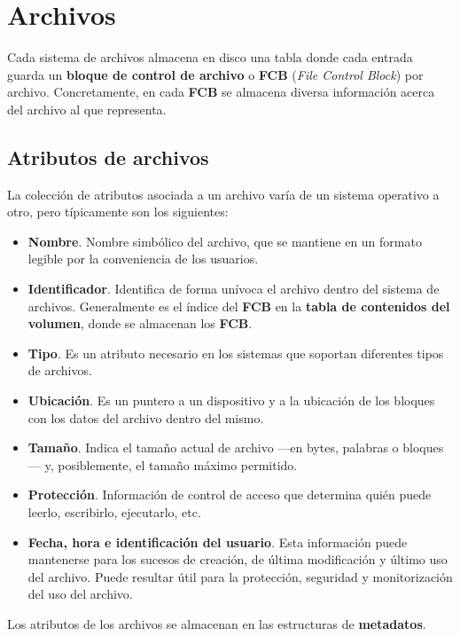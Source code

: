 \section{Archivos}\label{_archivos}

Cada sistema de archivos almacena en disco una tabla donde cada entrada
guarda un \textbf{bloque de control de archivo} o \textbf{FCB}
(\emph{File Control Block}) por archivo. Concretamente, en cada
\textbf{FCB} se almacena diversa información acerca del archivo al que
representa.

\subsection{Atributos de archivos}\label{_atributos_de_archivos}

La colección de atributos asociada a un archivo varía de un sistema
operativo a otro, pero típicamente son los siguientes:

\begin{itemize}
\item
  \textbf{Nombre}. Nombre simbólico del archivo, que se mantiene en un
  formato legible por la conveniencia de los usuarios.
\item
  \textbf{Identificador}. Identifica de forma unívoca el archivo dentro
  del sistema de archivos. Generalmente es el índice del \textbf{FCB} en
  la \textbf{tabla de contenidos del volumen}, donde se almacenan los
  \textbf{FCB}.
\item
  \textbf{Tipo}. Es un atributo necesario en los sistemas que soportan
  diferentes tipos de archivos.
\item
  \textbf{Ubicación}. Es un puntero a un dispositivo y a la ubicación de
  los bloques con los datos del archivo dentro del mismo.
\item
  \textbf{Tamaño}. Indica el tamaño actual de archivo ---en bytes,
  palabras o bloques--- y, posiblemente, el tamaño máximo permitido.
\item
  \textbf{Protección}. Información de control de acceso que determina
  quién puede leerlo, escribirlo, ejecutarlo, etc.
\item
  \textbf{Fecha, hora e identificación del usuario}. Esta información
  puede mantenerse para los sucesos de creación, de última modificación
  y último uso del archivo. Puede resultar útil para la protección,
  seguridad y monitorización del uso del archivo.
\end{itemize}

Los atributos de los archivos se almacenan en las estructuras de
\textbf{metadatos}.

